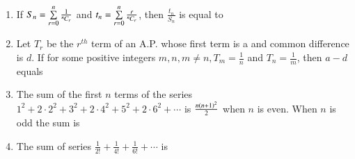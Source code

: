 \documentclass[journal,12pt,twocolumn]{IEEEtran}
\theoremstyle{remark}
\begin{document}
\begin{enumerate}[label={\arabic*.}]
\item {If $S_n = \sum\limits_{r=0}^{n} \frac{1}{{{}^{n}\mkern-1muC_{r}}}$ and $t_n = \sum\limits_{r=0}^{n} \frac{r}{{{}^{n}\mkern-1muC_{r}}}$, then $\frac{t_n}{S_n}$ is equal to}
{\hfill{}} 
\begin{enumerate}
\end{enumerate}

\item {Let $T_r$ be the $r^{th}$ term of an A.P. whose first term is a and common difference is $d$. If for some positive integers $m,n, m\neq n, T_m = \frac{1}{n}$ and $T_n = \frac{1}{m}$, then $a-d$ equals} 
{\hfill{}}
\begin{enumerate}
\end{enumerate}

\item {The sum of the first $n$ terms of the series $1^2+2\cdot2^2+3^2+2\cdot4^2+5^2+2\cdot6^2+\cdots$ is $\frac{n\left(n+1\right)^2}{2}$ when $n$ is even. When $n$ is odd the sum is}
{\hfill{}}
\begin{enumerate}
\end{enumerate}

\item {The sum of series $\frac{1}{2!}+\frac{1}{4!}+\frac{1}{6!}+\cdots$ is}
{\hfill{}} 
\begin{enumerate}
\begin{multicols}{2}


\end{multicols}
\end{enumerate}
\end{enumerate}
\end{document}
